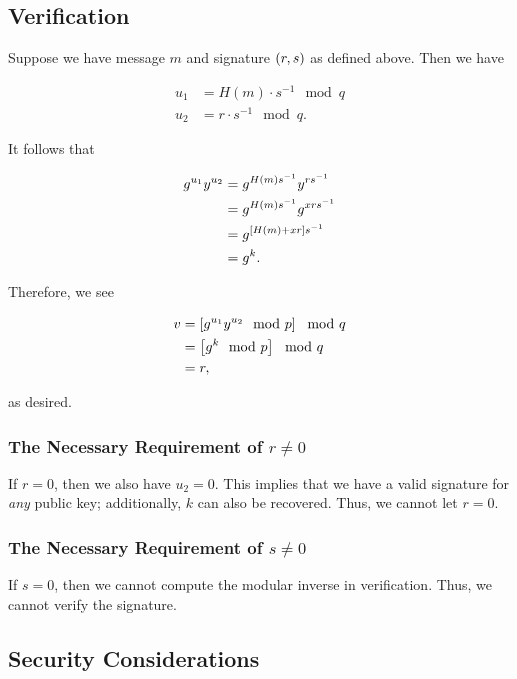 \subsection{Verification}

Suppose we have message $m$ and signature $\left( r,s \right)$ as defined above.
Then we have

\begin{align}
    u_{1} &= H(m)\cdot s^{-1} \mod q \nonumber\\
    u_{2} &= r\cdot s^{-1} \mod q.
\end{align}

\noindent
It follows that

\begin{align}
    g^{u_{1}}y^{u_{2}} &= g^{H(m)s^{-1}} y^{rs^{-1}} \nonumber\\
        &= g^{H(m)s^{-1}} g^{xrs^{-1}} \nonumber\\
        &= g^{\left[ H(m) + xr \right]s^{-1}} \nonumber\\
        &= g^{k}.
\end{align}

\noindent
Therefore, we see

\begin{align}
    v &= \left[ g^{u_{1}}y^{u_{2}} \mod p \right] \mod q \nonumber\\
        &= \left[ g^{k} \mod p \right] \mod q \nonumber\\
        &= r,
\end{align}

\noindent
as desired.

\subsubsection{The Necessary Requirement of $r\ne0$}
If $r=0$, then we also have $u_{2}=0$.
This implies that we have a valid signature for \emph{any}
public key; additionally, $k$ can also be recovered.
Thus, we cannot let $r=0$.

\subsubsection{The Necessary Requirement of $s\ne0$}
If $s=0$, then we cannot compute the modular inverse in verification.
Thus, we cannot verify the signature.

\subsection{Security Considerations}

